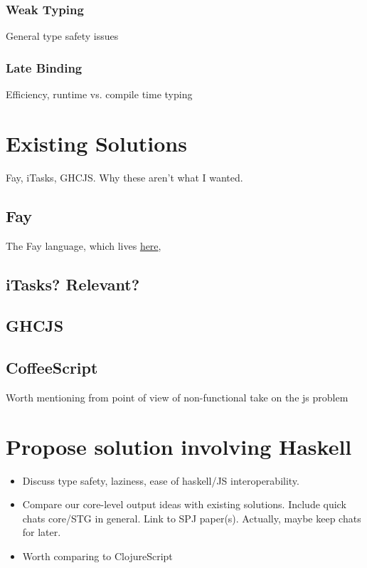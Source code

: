 \documentclass[11pt]{article}
\begin{document}
\subsubsection{Weak Typing}
General type safety issues

\subsubsection{Late Binding}
Efficiency, runtime vs. compile time typing

\pagebreak

\section{Existing Solutions}
Fay, iTasks, GHCJS. Why these aren't what I wanted.

\subsection{Fay}
The Fay language, which lives \href{https://github.com/faylang/fay/wiki}{here}, 

\subsection{iTasks? Relevant?}

\subsection{GHCJS}

\subsection{CoffeeScript}
Worth mentioning from point of view of non-functional take on the js problem

\section{Propose solution involving Haskell}
\begin{itemize}
\item Discuss type safety, laziness, ease of haskell/JS interoperability.
\item Compare our core-level output ideas with existing solutions. Include quick chats
	  core/STG in general. Link to SPJ paper(s). Actually, maybe keep chats for later.
\item Worth comparing to ClojureScript 
\end{itemize}
\end{document}
